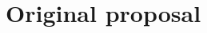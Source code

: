 \cleardoublepage

\nocite{*}
\printbibliography[heading=bibintoc]

\appendix

\cleardoublepage
\chapter{Original proposal}


